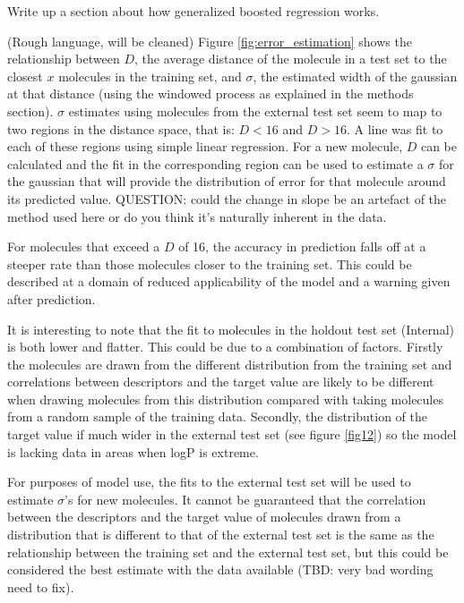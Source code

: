 Write up a section about how generalized boosted regression works.

(Rough language, will be cleaned) Figure \ref{fig:error_estimation} shows the relationship between $D$, the average distance of the molecule in a test set to the closest $x$ molecules in the training set, and $\sigma$, the estimated width of the gaussian at that distance (using the windowed process as explained in the methods section). $\sigma$ estimates using molecules from the external test set seem to map to two regions in the distance space, that is: $D < 16$ and $D > 16$. A line was fit to each of these regions using simple linear regression. For a new molecule, $D$ can be calculated and the fit in the corresponding region can be used to estimate a $\sigma$ for the gaussian that will provide the distribution of error for that molecule around its predicted value. QUESTION: could the change in slope be an artefact of the method used here or do you think it's naturally inherent in the data.

For molecules that exceed a $D$ of 16, the accuracy in prediction falls off at a steeper rate than those molecules closer to the training set. This could be described at a domain of reduced applicability of the model and a warning given after prediction.

It is interesting to note that the fit to molecules in the holdout test set (Internal) is both lower and flatter. This could be due to a combination of factors. Firstly the molecules are drawn from the different distribution from the training set and correlations between descriptors and the target value are likely to be different when drawing molecules from this distribution compared with taking molecules from a random sample of the training data. Secondly, the distribution of the target value if much wider in the external test set (see figure \ref{fig12}) so the model is lacking data in areas when logP is extreme.

For purposes of model use, the fits to the external test set will be used to estimate $\sigma$'s for new molecules. It cannot be guaranteed that the correlation between the descriptors and the target value of molecules drawn from a distribution that is different to that of the external test set is the same as the relationship between the training set and the external test set, but this could be considered the best estimate with the data available (TBD: very bad wording need to fix).

